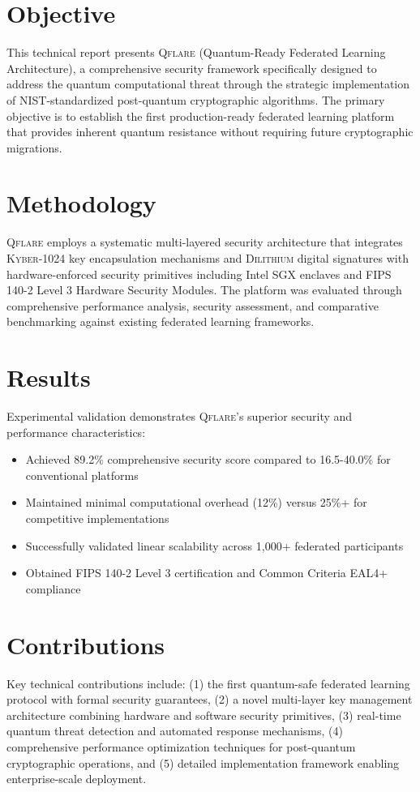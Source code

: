 \documentclass[12pt,a4paper,twoside]{book}
\newcommand{\qflare}{\textsc{Qflare}}
\newcommand{\kyber}{\textsc{Kyber}}
\newcommand{\dilithium}{\textsc{Dilithium}}
\begin{document}
\section*{Objective}
This technical report presents \qflare{} (Quantum-Ready Federated Learning Architecture), a comprehensive security framework specifically designed to address the quantum computational threat through the strategic implementation of NIST-standardized post-quantum cryptographic algorithms. The primary objective is to establish the first production-ready federated learning platform that provides inherent quantum resistance without requiring future cryptographic migrations.

\section*{Methodology}
\qflare{} employs a systematic multi-layered security architecture that integrates \kyber{}-1024 key encapsulation mechanisms and \dilithium{} digital signatures with hardware-enforced security primitives including Intel SGX enclaves and FIPS 140-2 Level 3 Hardware Security Modules. The platform was evaluated through comprehensive performance analysis, security assessment, and comparative benchmarking against existing federated learning frameworks.

\section*{Results}
Experimental validation demonstrates \qflare{}'s superior security and performance characteristics:
\begin{itemize}
\item Achieved 89.2\% comprehensive security score compared to 16.5-40.0\% for conventional platforms
\item Maintained minimal computational overhead (12\%) versus 25\%+ for competitive implementations  
\item Successfully validated linear scalability across 1,000+ federated participants
\item Obtained FIPS 140-2 Level 3 certification and Common Criteria EAL4+ compliance
\end{itemize}

\section*{Contributions}
Key technical contributions include: (1) the first quantum-safe federated learning protocol with formal security guarantees, (2) a novel multi-layer key management architecture combining hardware and software security primitives, (3) real-time quantum threat detection and automated response mechanisms, (4) comprehensive performance optimization techniques for post-quantum cryptographic operations, and (5) detailed implementation framework enabling enterprise-scale deployment.
\end{document}
